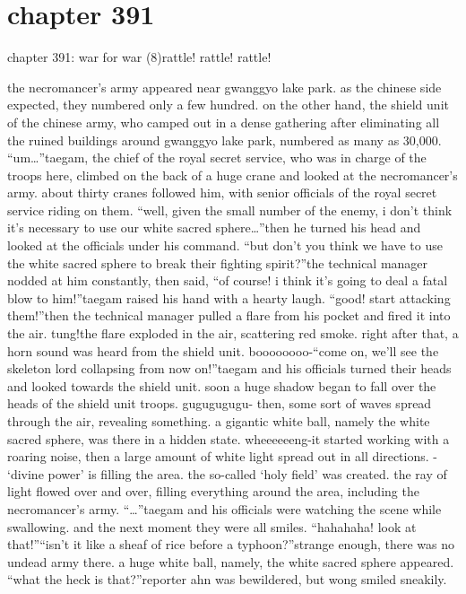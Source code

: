 \section{chapter 391}

chapter 391: war for war (8)rattle! rattle! rattle!




the necromancer’s army appeared near gwanggyo lake park.
as the chinese side expected, they numbered only a few hundred.
on the other hand, the shield unit of the chinese army, who camped out in a dense gathering after eliminating all the ruined buildings around gwanggyo lake park, numbered as many as 30,000.
“um…”taegam, the chief of the royal secret service, who was in charge of the troops here, climbed on the back of a huge crane and looked at the necromancer’s army.
about thirty cranes followed him, with senior officials of the royal secret service riding on them.
“well, given the small number of the enemy, i don’t think it’s necessary to use our white sacred sphere…”then he turned his head and looked at the officials under his command.
“but don’t you think we have to use the white sacred sphere to break their fighting spirit?”the technical manager nodded at him constantly, then said, “of course! i think it’s going to deal a fatal blow to him!”taegam raised his hand with a hearty laugh.
“good! start attacking them!”then the technical manager pulled a flare from his pocket and fired it into the air.
tung!the flare exploded in the air, scattering red smoke.
 right after that, a horn sound was heard from the shield unit.
boooooooo-“come on, we’ll see the skeleton lord collapsing from now on!”taegam and his officials turned their heads and looked towards the shield unit.
 soon a huge shadow began to fall over the heads of the shield unit troops.
gugugugugu-
then, some sort of waves spread through the air, revealing something.
a gigantic white ball, namely the white sacred sphere, was there in a hidden state.
wheeeeeeng-it started working with a roaring noise, then a large amount of white light spread out in all directions.
- ‘divine power’ is filling the area.
the so-called ‘holy field’ was created.
 the ray of light flowed over and over, filling everything around the area, including the necromancer’s army.
“…”taegam and his officials were watching the scene while swallowing.
and the next moment they were all smiles.
“hahahaha! look at that!”“isn’t it like a sheaf of rice before a typhoon?”strange enough, there was no undead army there.
a huge white ball, namely, the white sacred sphere appeared.
“what the heck is that?”reporter ahn was bewildered, but wong smiled sneakily.
